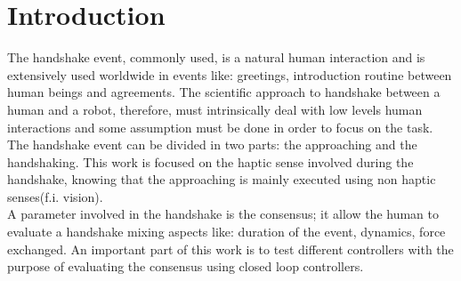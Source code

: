 \chapter*{Introduction}
The handshake event, commonly used, is a natural human interaction and is extensively used worldwide in events like: greetings, introduction routine between human beings and agreements. 
The scientific approach to handshake between a human and a robot, therefore, must intrinsically deal with low levels human interactions and some assumption must be done in order to focus on the task.
The handshake event can be divided in two parts: the approaching and the handshaking. This work is focused on the haptic sense involved during the handshake, knowing that the approaching is mainly executed using non haptic senses(f.i. vision).\\ %
A parameter involved in the handshake is the consensus; it allow the human to evaluate a handshake mixing aspects like: duration of the event, dynamics, force exchanged.
An important part of this work is to test different controllers with the purpose of evaluating the consensus using closed loop controllers. 
  
